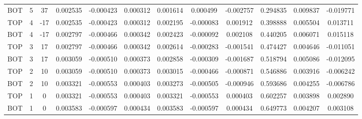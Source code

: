 \begin{landscape}
\begin{table}
\begin{tabular}{|ccc|ccc|ccc|ccc|}
BOT &    5 &     37 &  0.002535 & -0.000423 &  0.000312 &  0.001614 &  0.000499 & -0.002757 &       0.294835 &       0.009837 &      -0.019771 \\
TOP &    4 &    -17 &  0.002535 & -0.000423 &  0.000312 &  0.002195 & -0.000083 &  0.001912 &       0.398888 &       0.005504 &       0.013711 \\
BOT &    4 &    -17 &  0.002797 & -0.000466 &  0.000342 &  0.002423 & -0.000092 &  0.002108 &       0.440205 &       0.006071 &       0.015118 \\
TOP &    3 &     17 &  0.002797 & -0.000466 &  0.000342 &  0.002614 & -0.000283 & -0.001541 &       0.474427 &       0.004646 &      -0.011051 \\
BOT &    3 &     17 &  0.003059 & -0.000510 &  0.000373 &  0.002858 & -0.000309 & -0.001687 &       0.518794 &       0.005086 &      -0.012095 \\
TOP &    2 &     10 &  0.003059 & -0.000510 &  0.000373 &  0.003015 & -0.000466 & -0.000871 &       0.546886 &       0.003916 &      -0.006242 \\
BOT &    2 &     10 &  0.003321 & -0.000553 &  0.000403 &  0.003273 & -0.000505 & -0.000946 &       0.593686 &       0.004255 &      -0.006786 \\
TOP &    1 &      0 &  0.003321 & -0.000553 &  0.000403 &  0.003321 & -0.000553 &  0.000403 &       0.602257 &       0.003898 &       0.002890 \\
BOT &    1 &      0 &  0.003583 & -0.000597 &  0.000434 &  0.003583 & -0.000597 &  0.000434 &       0.649773 &       0.004207 &       0.003108 \\
\bottomrule
\end{tabular}
\end{table}


\end{landscape}
